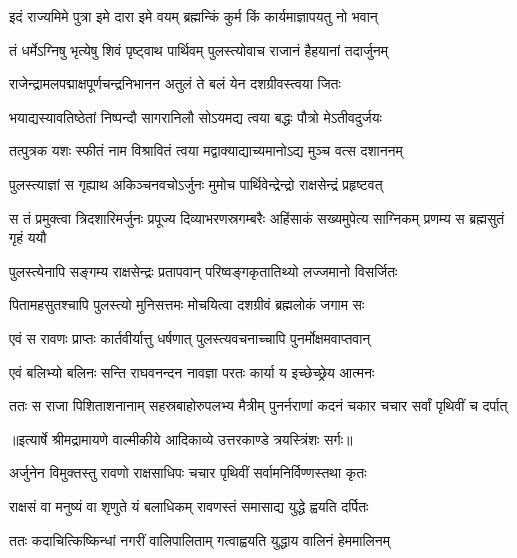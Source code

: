 \twolineshloka
{इदं राज्यमिमे पुत्रा इमे दारा इमे वयम्}
{ब्रह्मन्किं कुर्म किं कार्यमाज्ञापयतु नो भवान्} %

\twolineshloka
{तं धर्मेऽग्निषु भृत्येषु शिवं पृष्ट्वाथ पार्थिवम्}
{पुलस्त्योवाच राजानं हैहयानां तदार्जुनम्} %

\twolineshloka
{राजेन्द्रामलपद्माक्षपूर्णचन्द्रनिभानन}
{अतुलं ते बलं येन दशग्रीवस्त्वया जितः} %

\twolineshloka
{भयाद्यस्यावतिष्ठेतां निष्पन्दौ सागरानिलौ}
{सोऽयमद्य त्वया बद्धः पौत्रो मेऽतीवदुर्जयः} %

\twolineshloka
{तत्पुत्रक यशः स्फीतं नाम विश्रावितं त्वया}
{मद्वाक्याद्याच्यमानोऽद्य मुञ्च वत्स दशाननम्} %

\twolineshloka
{पुलस्त्याज्ञां स गृह्याथ अकिञ्चनवचोऽर्जुनः}
{मुमोच पार्थिवेन्द्रेन्द्रो राक्षसेन्द्रं प्रहृष्टवत्} %

\fourlineindentedshloka
{स तं प्रमुक्त्वा त्रिदशारिमर्जुनः}
{प्रपूज्य दिव्याभरणस्रगम्बरैः}
{अहिंसाकं सख्यमुपेत्य साग्निकम्}
{प्रणम्य स ब्रह्मसुतं गृहं ययौ} %

\twolineshloka
{पुलस्त्येनापि सङ्गम्य राक्षसेन्द्रः प्रतापवान्}
{परिष्वङ्गकृतातिथ्यो लज्जमानो विसर्जितः} %

\twolineshloka
{पितामहसुतश्चापि पुलस्त्यो मुनिसत्तमः}
{मोचयित्वा दशग्रीवं ब्रह्मलोकं जगाम सः} %

\twolineshloka
{एवं स रावणः प्राप्तः कार्तवीर्यात्तु धर्षणात्}
{पुलस्त्यवचनाच्चापि पुनर्मोक्षमवाप्तवान्} %

\twolineshloka
{एवं बलिभ्यो बलिनः सन्ति राघवनन्दन}
{नावज्ञा परतः कार्या य इच्छेच्छ्रेय आत्मनः} %

\fourlineindentedshloka
{ततः स राजा पिशिताशनानाम्}
{सहस्रबाहोरुपलभ्य मैत्रीम्}
{पुनर्नराणां कदनं चकार}
{चचार सर्वां पृथिवीं च दर्पात्} %


{॥इत्यार्षे श्रीमद्रामायणे वाल्मीकीये आदिकाव्ये उत्तरकाण्डे त्रयस्त्रिंशः सर्गः॥}


\twolineshloka
{अर्जुनेन विमुक्तस्तु रावणो राक्षसाधिपः}
{चचार पृथिवीं सर्वामनिर्विण्णस्तथा कृतः} %

\twolineshloka
{राक्षसं वा मनुष्यं वा शृणुते यं बलाधिकम्}
{रावणस्तं समासाद्य युद्धे ह्वयति दर्पितः} %

\twolineshloka
{ततः कदाचित्किष्किन्धां नगरीं वालिपालिताम्}
{गत्वाह्वयति युद्धाय वालिनं हेममालिनम्} %

